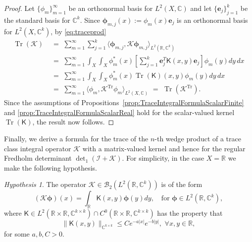 \documentclass{birkjour}
\theoremstyle{definition}
\theoremstyle{remark}
\numberwithin{equation}{section}
\newtheorem{hypothesis}[thm]{Hypothesis}
\newcommand{\cB}{{\mathcal B}}
\begin{document}
\begin{proof}
Let $\{\phi_m\}_{m=1}^\infty$ be an orthonormal basis for 
$L^2(X,\mathbb C)$ and let $\{ \mathbf e_j\}_{j=1}^k$
be the standard basis for $\mathbb C^k$. Since
$\boldsymbol{\phi}_{m,j}(x)  := \phi_m(x) \mathbf e_j$ is an orthonormal
basis for $L^2(X,\mathbb C^k)$, by \eqref{eq:traceprod}
\begin{align}
\operatorname{Tr}(\mathcal{K}) 
&\,\,=\,\, \sum_{m=1}^{\infty} \sum_{j=1}^k \langle \boldsymbol{\phi}_{m,j}, \mathcal{K} \boldsymbol{\phi}_{m,j} \rangle_{L^2(\mathbb {R},\mathbb{C}^k)}
\nonumber
\\
&\,\,=\,\, \sum_{m=1}^{\infty} \int_X \int_X \phi_m^*(x) \left[ \sum_{j=1}^k \mathbf{e}_j^T \textsf{K}(x,y) \mathbf{e}_j \right] \phi_m(y) dy \,dx
\nonumber
\\
&\,\,=\,\, \sum_{m=1}^{\infty} \int_X \int_X \phi^*_m(x) \operatorname{Tr}(\textsf{K})(x,y) \phi_m(y) dy\, dx
\nonumber
\\
&\,\,=\,\, \sum_{m=1}^{\infty} \langle \phi_m, \mathcal{K}^{\operatorname{Tr}} \phi_m \rangle_{L^2(X,\mathbb{C})}
\,\,=\,\, \operatorname{Tr}(\mathcal{K}^{\operatorname{Tr}}).
\end{align}
Since the assumptions of Propositions~\ref{prop:TraceIntegralFormulaScalarFinite} and \ref{prop:TraceIntegralFormulaScalarReal} hold for the
scalar-valued kernel $\operatorname{Tr}(\textsf{K})$, the result now follows.
\end{proof}

Finally, we derive a formula for the trace of the $n$-th wedge product of a trace class integral  operator $\mathcal{K}$ with a matrix-valued kernel
and hence for the 
regular Fredholm determinant  $\det_1(\mathcal{I} + \mathcal{K})$. 
For simplicity, 
in the case $X=\mathbb R$ we make the following hypothesis.


\begin{hypothesis}\label{hyp9}
The operator $\mathcal{K} \in \cB_2(L^2(\mathbb{R},\mathbb{C}^k))$ is of the form
\begin{equation}
    (\mathcal{K} \boldsymbol{\phi})(x) = \int_{\mathbb{R}} \textsf{K}(x,y) \boldsymbol{\phi}(y) dy,
    \quad\text{for }\boldsymbol{\phi} \in L^2(\mathbb{R},\mathbb{C}^k),
\end{equation}
where  $\textsf{K} \in L^2(\mathbb{R} \times \mathbb{R}, \mathbb{C}^{k \times k}) \cap C^0(\mathbb{R} \times \mathbb{R}, \mathbb{C}^{k \times k})$ has the property that 
 \begin{equation}\label{eq:HypExpDecay}
    \|\textsf{K}(x,y)\|_{\mathbb{C}^{k \times k}} \leq Ce^{-a |x|}e^{-b|y|}, \,\, \forall x, y \in \mathbb{R},
\end{equation}
for some $a,b,C > 0$.
\end{hypothesis}
\end{document}
